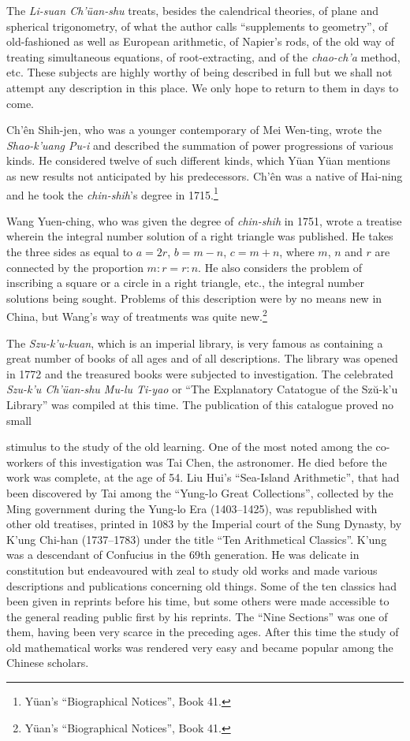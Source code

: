 \documentclass[11pt]{article}
\newcommand{\scanpage}[2]{\clearpage\setcounter{footnote}{0}\noindent{\footnotesize\color{gray}PDF page #1 · #2}\par\medskip}
\newcommand{\scanfooter}{}
\begin{document}
The \emph{Li-suan Ch'üan-shu} treats, besides the calendrical theories, of plane and spherical trigonometry, of what the author calls ``supplements to geometry'', of old-fashioned as well as European arithmetic, of Napier's rods, of the old way of treating simultaneous equations, of root-extracting, and of the \emph{chao-ch'a} method, etc. These subjects are highly worthy of being described in full but we shall not attempt any description in this place. We only hope to return to them in days to come.

Ch'ên Shih-jen, who was a younger contemporary of Mei Wen-ting, wrote the \emph{Shao-k'uang Pu-i} and described the summation of power progressions of various kinds. He considered twelve of such different kinds, which Yüan Yüan mentions as new results not anticipated by his predecessors. Ch'ên was a native of Hai-ning and he took the \emph{chin-shih}'s degree in 1715.\footnote{Yüan's ``Biographical Notices'', Book 41.}

Wang Yuen-ching, who was given the degree of \emph{chin-shih} in 1751, wrote a treatise wherein the integral number solution of a right triangle was published. He takes the three sides as equal to $a=2r$, $b=m-n$, $c=m+n$, where $m$, $n$ and $r$ are connected by the proportion $m:r=r:n$. He also considers the problem of inscribing a square or a circle in a right triangle, etc., the integral number solutions being sought. Problems of this description were by no means new in China, but Wang's way of treatments was quite new.\footnote{Yüan's ``Biographical Notices'', Book 41.}

The \emph{Szu-k'u-kuan}, which is an imperial library, is very famous as containing a great number of books of all ages and of all descriptions. The library was opened in 1772 and the treasured books were subjected to investigation. The celebrated \emph{Szu-k'u Ch'üan-shu Mu-lu Ti-yao} or ``The Explanatory Catatogue of the Szŭ-k'u Library'' was compiled at this time. The publication of this catalogue proved no small
\scanfooter

\scanpage{0137}{Chapter 18, printed page 123}
stimulus to the study of the old learning. One of the most noted among the co-workers of this investigation was Tai Chen, the astronomer. He died before the work was complete, at the age of 54. Liu Hui's ``Sea-Island Arithmetic'', that had been discovered by Tai among the ``Yung-lo Great Collections'', collected by the Ming government during the Yung-lo Era (1403--1425), was republished with other old treatises, printed in 1083 by the Imperial court of the Sung Dynasty, by K'ung Chi-han (1737--1783) under the title ``Ten Arithmetical Classics''. K'ung was a descendant of Confucius in the 69th generation. He was delicate in constitution but endeavoured with zeal to study old works and made various descriptions and publications concerning old things. Some of the ten classics had been given in reprints before his time, but some others were made accessible to the general reading public first by his reprints. The ``Nine Sections'' was one of them, having been very scarce in the preceding ages. After this time the study of old mathematical works was rendered very easy and became popular among the Chinese scholars.
\end{document}
